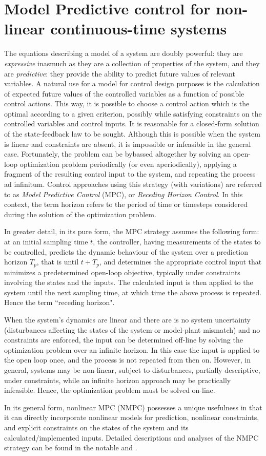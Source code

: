\section{Model Predictive control for non-linear continuous-time systems}

The equations describing a model of a system are doubly powerful: they
are \textit{expressive} inasmuch as they are a collection of properties of the
system, and they are \textit{predictive}: they provide the ability to predict
future values of relevant variables. A natural use for a model for control
design purposes is the calculation of expected future values of the controlled
variables as a function of possible control actions. This way, it is possible
to choose a control action which is the optimal according to a given criterion,
possibly while satisfying constraints on the controlled variables and control
inputs. It is reasonable for a closed-form solution of the state-feedback law
to be sought. Although this is possible when the system is linear and constraints
are absent, it is impossible or infeasible in the general case. Fortunately,
the problem can be bybassed altogether by solving an open-loop optimization
problem periodically (or even aperiodically), applying a fragment of
the resulting control input to the system, and repeating the process ad
infinitum. Control approaches using this strategy (with variations) are referred
to as \textit{Model Predictive Control} (MPC), or \textit{Receding Horizon Control}.
In this context, the term horizon refers to the period of time or timesteps
considered during the solution of the optimization problem.

In greater detail, in its pure form, the MPC strategy assumes the following
form: at an initial sampling time $t$, the controller, having measurements of
the states to be controlled, predicts the dynamic behaviour of the system over a
prediction horizon $T_p$, that is until $t+T_p$, and determines the appropriate
control input that minimizes a predetermined open-loop objective, typically
under constraints involving the states and the inputs. The calculated input
is then applied to the system until the next sampling time, at which time
the above process is repeated. Hence the term ``receding horizon".

When the system's dynamics are linear and there are is no system uncertainty
(disturbances affecting the states of the system or model-plant mismatch)
and no constraints are enforced, the input can be determined off-line by
solving the optimization problem over an infinite horizon. In this case the
input is applied to the open loop once, and the process is not repeated from
then on. However, in general, systems may be non-linear, subject to disturbances,
partially descriptive, under constraints, while an infinite horizon approach
may be practically infeasible. Hence, the optimization problem must be solved
on-line.

In its general form, nonlinear MPC (NMPC) possesses a unique usefulness
in that it can directly incorporate nonlinear models for prediction,
nonlinear constraints, and explicit constraints on the states of the system
and its calculated/implemented inputs. Detailed descriptions and analyses of the
NMPC strategy can be found in the notable \cite{262032} and \cite{FINDEISEN2003190}.
